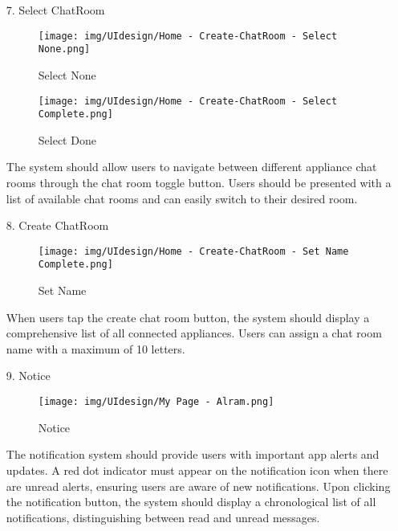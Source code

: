 \documentclass[conference]{IEEEtran}
\begin{document}
\begin{enumerate}
    \item[7.] Select ChatRoom
    \begin{figure}[h]
        \centering
        \begin{minipage}{0.4\columnwidth}
    \texttt{[image: img/UIdesign/Home - Create-ChatRoom - Select None.png]}
    \caption{Select None}
\end{minipage}
        \hfill
        \begin{minipage}{0.4\columnwidth}
    \texttt{[image: img/UIdesign/Home - Create-ChatRoom - Select Complete.png]}
    \caption{Select Done}
\end{minipage}
    \end{figure}
    
    The system should allow users to navigate between different appliance chat rooms through the chat room toggle button. Users should be presented with a list of available chat rooms and can easily switch to their desired room. \\
\end{enumerate}

\begin{enumerate}
    \item[8.] Create ChatRoom
    \begin{figure}[h]
\hspace{1.5cm}
\centering
\begin{minipage}{0.4\columnwidth}
    \texttt{[image: img/UIdesign/Home - Create-ChatRoom - Set Name Complete.png]}
    \caption{Set Name}
\end{minipage}
\end{figure}
    
    When users tap the create chat room button, the system should display a comprehensive list of all connected appliances. Users can assign a chat room name with a maximum of 10 letters.\\
\end{enumerate}

\begin{enumerate}
    \item[9.] Notice
    \begin{figure}[h]
\hspace{1.5cm}
\centering
\begin{minipage}{0.4\columnwidth}
    \texttt{[image: img/UIdesign/My Page - Alram.png]}
    \caption{Notice}
\end{minipage}
\end{figure}
    
    The notification system should provide users with important app alerts and updates. A red dot indicator must appear on the notification icon when there are unread alerts, ensuring users are aware of new notifications. Upon clicking the notification button, the system should display a chronological list of all notifications, distinguishing between read and unread messages.\\
\end{enumerate}
\end{document}

